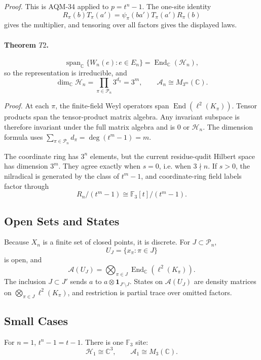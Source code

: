\emph{Proof.}
This is AQM-34 applied to \(p=t^n-1\).  The one-site identity
\[
  R_\pi(b)T_\pi(a')=\psi_\pi(ba')T_\pi(a')R_\pi(b)
\]
gives the multiplier, and tensoring over all factors gives the displayed laws.

\paragraph{Theorem \(T2\).}
\[
  \operatorname{span}_{\mathbb C}\{W_n(e):e\in E_n\}
  =
  \operatorname{End}_{\mathbb C}(\mathcal H_n),
\]
so the representation is irreducible, and
\[
  \dim_{\mathbb C}\mathcal H_n
  =\prod_{\pi\in\mathcal P_n}3^{d_\pi}
  =3^m,\qquad
  \mathcal A_n\cong M_{3^m}(\mathbb C).
\]

\emph{Proof.}
At each \(\pi\), the finite-field Weyl operators span
\(\operatorname{End}(\ell^2(K_\pi))\).  Tensor products span the tensor-product
matrix algebra.  Any invariant subspace is therefore invariant under the full
matrix algebra and is \(0\) or \(\mathcal H_n\).  The dimension formula uses
\(\sum_{\pi\in\mathcal P_n}d_\pi=\deg(t^m-1)=m\).

The coordinate ring has \(3^n\) elements, but the current residue-qudit Hilbert
space has dimension \(3^m\).  They agree exactly when \(s=0\), i.e. when
\(3\nmid n\).  If \(s>0\), the nilradical is generated by the class of
\(t^m-1\), and coordinate-ring field labels factor through
\[
  R_n/(t^m-1)\cong \mathbb F_3[t]/(t^m-1).
\]

\subsection{Open Sets and States}

Because \(X_n\) is a finite set of closed points, it is discrete.  For
\(J\subset\mathcal P_n\),
\[
  U_J=\{x_\pi:\pi\in J\}
\]
is open, and
\[
  \mathcal A(U_J)=
  \bigotimes_{\pi\in J}\operatorname{End}_{\mathbb C}(\ell^2(K_\pi)).
\]
The inclusion \(J\subset J'\) sends \(a\) to
\(a\otimes\mathbf1_{J'\setminus J}\).  States on \(\mathcal A(U_J)\) are
density matrices on \(\bigotimes_{\pi\in J}\ell^2(K_\pi)\), and restriction is
partial trace over omitted factors.

\subsection{Small Cases}

For \(n=1\), \(t^n-1=t-1\).  There is one \(\mathbb F_3\) site:
\[
  \mathcal H_1\cong\mathbb C^3,\qquad
  \mathcal A_1\cong M_3(\mathbb C).
\]

